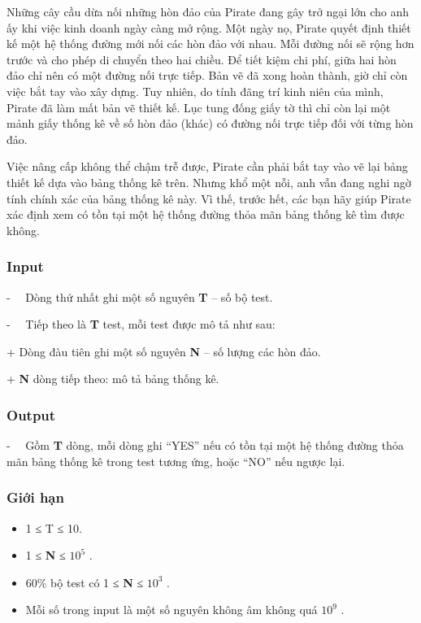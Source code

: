 

Những cây cầu dừa nối những hòn đảo của Pirate đang gây trở ngại lớn cho anh ấy khi việc kinh doanh ngày càng mở rộng. Một ngày nọ, Pirate quyết định thiết kế một hệ thống đường mới nối các hòn đảo với nhau. Mỗi đường nối sẽ rộng hơn trước và cho phép di chuyển theo hai chiều. Để tiết kiệm chi phí, giữa hai hòn đảo chỉ nên có một đường nối trực tiếp. Bản vẽ đã xong hoàn thành, giờ chỉ còn việc bắt tay vào xây dựng. Tuy nhiên, do tính đãng trí kinh niên của mình, Pirate đã làm mất bản vẽ thiết kế. Lục tung đống giấy tờ thì chỉ còn lại một mảnh giấy thống kê về số hòn đảo (khác) có đường nối trực tiếp đối với từng hòn đảo.

Việc nâng cấp không thể chậm trễ được, Pirate cần phải bắt tay vào vẽ lại bảng thiết kế dựa vào bảng thống kê trên. Nhưng khổ một nỗi, anh vẫn đang nghi ngờ tính chính xác của bảng thống kê này. Vì thế, trước hết, các bạn hãy giúp Pirate xác định xem có tồn tại một hệ thống đường thỏa mãn bảng thống kê tìm được không.

\subsubsection{Input}

-   Dòng thứ nhất ghi một số nguyên \textbf{ T } – số bộ test.

-   Tiếp theo là \textbf{ T } test, mỗi test được mô tả như sau:

+ Dòng đàu tiên ghi một số nguyên \textbf{ N } – số lượng các hòn đảo.

+ \textbf{ N } dòng tiếp theo: mô tả bảng thống kê.

\subsubsection{Output}

-   Gồm \textbf{ T } dòng, mỗi dòng ghi “YES” nếu có tồn tại một hệ thống đường thỏa mãn bảng thống kê trong test tương ứng, hoặc “NO” nếu ngược lại.

\subsubsection{Giới hạn}
\begin{itemize}
	\item 1 ≤ T ≤ 10.
	\item 1 ≤ \textbf{ N } ≤ $10^{5}$ .
	\item 60\% bộ test có 1 ≤ \textbf{ N } ≤ $10^{3}$ .
	\item Mỗi số trong input là một số nguyên không âm không quá $10^{9}$ .
\end{itemize}

